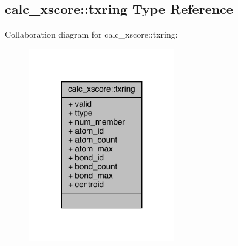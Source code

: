 \hypertarget{structcalc__xscore_1_1txring}{\subsection{calc\-\_\-xscore\-:\-:txring Type Reference}
\label{structcalc__xscore_1_1txring}
}


Collaboration diagram for calc\-\_\-xscore\-:\-:txring\-:
\nopagebreak
\begin{figure}[H]
\begin{center}
\leavevmode
\includegraphics[width=179pt]{structcalc__xscore_1_1txring__coll__graph}
\end{center}
\end{figure}

